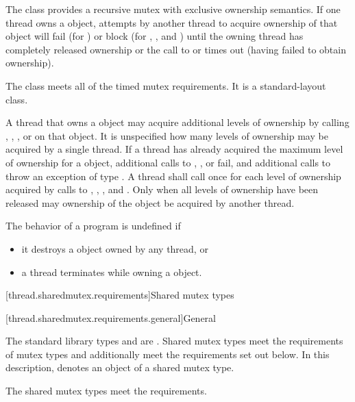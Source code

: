 \pnum
{}%
The class  provides a recursive mutex with exclusive
ownership semantics. If one thread owns a  object,
attempts by another thread to acquire ownership of that object will fail (for
) or block (for , , and
) until the owning thread has completely released
ownership or the call to  or 
times out (having failed to obtain ownership).

\pnum
The class  meets
all of the timed mutex requirements.
It is a standard-layout class.

\pnum
A thread that owns a  object may acquire additional
levels of ownership by calling , ,
, or  on that object. It is
unspecified how many levels of ownership may be acquired by a single thread. If
a thread has already acquired the maximum level of ownership for a
 object, additional calls to ,
, or  fail, and additional
calls to  throw an exception of type . A
thread shall call  once for each level of ownership acquired by
calls to , , , and
. Only when all levels of ownership have been released
may ownership of the object be acquired by another thread.

\pnum
The behavior of a program is undefined if
\begin{itemize}
\item it destroys a  object owned by any thread, or
\item a thread terminates while owning a  object.
\end{itemize}


[thread.sharedmutex.requirements]{Shared mutex types}

[thread.sharedmutex.requirements.general]{General}

\pnum
The standard library types  and 
are . Shared mutex types meet the requirements of
mutex types and additionally
meet the requirements set out below. In this description,
 denotes an object of a shared mutex type.
\begin{note}
The shared mutex types meet the 
requirements.
\end{note}


